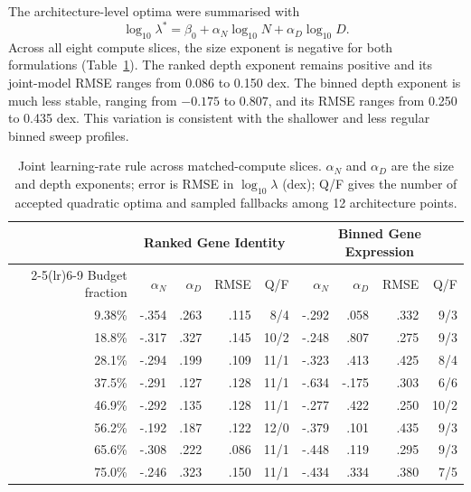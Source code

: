 \documentclass[11pt]{article}
\begin{document}
The architecture-level optima were summarised with
\begin{equation}
\log_{10}\lambda^*=\beta_0+\alpha_N\log_{10}N+\alpha_D\log_{10}D.
\end{equation}
Across all eight compute slices, the size exponent is negative for both formulations (Table~\ref{tab:supp-lr-slices}).
The ranked depth exponent remains positive and its joint-model RMSE ranges from 0.086 to 0.150 dex.
The binned depth exponent is much less stable, ranging from $-0.175$ to $0.807$, and its RMSE ranges from 0.250 to 0.435 dex.
This variation is consistent with the shallower and less regular binned sweep profiles.

\begin{table}[p]
\centering
\caption{Joint learning-rate rule across matched-compute slices. $\alpha_N$ and $\alpha_D$ are the size and depth exponents; error is RMSE in $\log_{10}\lambda$ (dex); Q/F gives the number of accepted quadratic optima and sampled fallbacks among 12 architecture points.}
\label{tab:supp-lr-slices}
\scriptsize
\begin{tabular}{r rrrr rrrr}
\toprule
& \multicolumn{4}{c}{Ranked Gene Identity} & \multicolumn{4}{c}{Binned Gene Expression} \\
\cmidrule(lr){2-5}\cmidrule(lr){6-9}
Budget fraction & $\alpha_N$ & $\alpha_D$ & RMSE & Q/F & $\alpha_N$ & $\alpha_D$ & RMSE & Q/F \\
\midrule
9.38\% & -.354 &  .263 & .115 & 8/4  & -.292 &  .058 & .332 & 9/3 \\
18.8\% & -.317 &  .327 & .145 & 10/2 & -.248 &  .807 & .275 & 9/3 \\
28.1\% & -.294 &  .199 & .109 & 11/1 & -.323 &  .413 & .425 & 8/4 \\
37.5\% & -.291 &  .127 & .128 & 11/1 & -.634 & -.175 & .303 & 6/6 \\
46.9\% & -.292 &  .135 & .128 & 11/1 & -.277 &  .422 & .250 & 10/2 \\
56.2\% & -.192 &  .187 & .122 & 12/0 & -.379 &  .101 & .435 & 9/3 \\
65.6\% & -.308 &  .222 & .086 & 11/1 & -.448 &  .119 & .295 & 9/3 \\
75.0\% & -.246 &  .323 & .150 & 11/1 & -.434 &  .334 & .380 & 7/5 \\
\bottomrule
\end{tabular}
\end{table}
\end{document}
